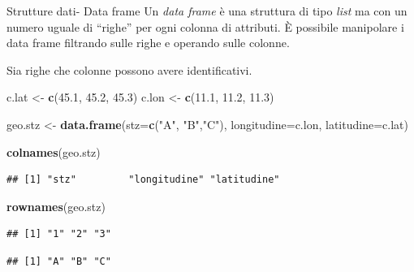 \documentclass[
  ignorenonframetext,
]{beamer}
\newenvironment{Shaded}{\begin{snugshade}}{\end{snugshade}}
\newcommand{\AttributeTok}[1]{\textcolor[rgb]{0.13,0.29,0.53}{#1}}
\newcommand{\FloatTok}[1]{\textcolor[rgb]{0.00,0.00,0.81}{#1}}
\newcommand{\FunctionTok}[1]{\textcolor[rgb]{0.13,0.29,0.53}{\textbf{#1}}}
\newcommand{\NormalTok}[1]{#1}
\newcommand{\OtherTok}[1]{\textcolor[rgb]{0.56,0.35,0.01}{#1}}
\newcommand{\SpecialCharTok}[1]{\textcolor[rgb]{0.81,0.36,0.00}{\textbf{#1}}}
\newcommand{\StringTok}[1]{\textcolor[rgb]{0.31,0.60,0.02}{#1}}
\begin{document}
\begin{frame}[fragile]{Strutture dati- Data frame}
\protect\hypertarget{strutture-dati--data-frame}{}
Un \emph{data frame} è una struttura di tipo \emph{list} ma con un
numero uguale di ``righe'' per ogni colonna di attributi. È possibile
manipolare i data frame filtrando sulle righe e operando sulle colonne.

Sia righe che colonne possono avere identificativi.

\begin{Shaded}
\begin{Highlighting}[]
\NormalTok{ c.lat }\OtherTok{\textless{}{-}} \FunctionTok{c}\NormalTok{(}\FloatTok{45.1}\NormalTok{, }\FloatTok{45.2}\NormalTok{, }\FloatTok{45.3}\NormalTok{)}
\NormalTok{ c.lon }\OtherTok{\textless{}{-}} \FunctionTok{c}\NormalTok{(}\FloatTok{11.1}\NormalTok{, }\FloatTok{11.2}\NormalTok{, }\FloatTok{11.3}\NormalTok{)}
 
\NormalTok{ geo.stz }\OtherTok{\textless{}{-}} \FunctionTok{data.frame}\NormalTok{(}\AttributeTok{stz=}\FunctionTok{c}\NormalTok{(}\StringTok{"A"}\NormalTok{, }\StringTok{"B"}\NormalTok{,}\StringTok{"C"}\NormalTok{),}
                          \AttributeTok{longitudine=}\NormalTok{c.lon,}
                          \AttributeTok{latitudine=}\NormalTok{c.lat)}
 
 \FunctionTok{colnames}\NormalTok{(geo.stz)}
\end{Highlighting}
\end{Shaded}

\begin{verbatim}
## [1] "stz"         "longitudine" "latitudine"
\end{verbatim}

\begin{Shaded}
\begin{Highlighting}[]
 \FunctionTok{rownames}\NormalTok{(geo.stz)}
\end{Highlighting}
\end{Shaded}

\begin{verbatim}
## [1] "1" "2" "3"
\end{verbatim}

\begin{Shaded}
\end{Shaded}

\begin{verbatim}
## [1] "A" "B" "C"
\end{verbatim}
\end{frame}
\end{document}
